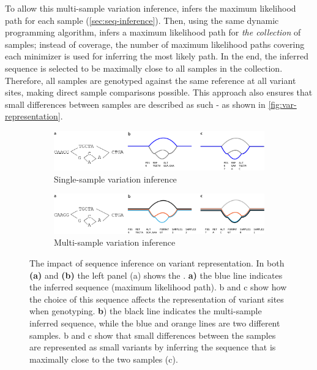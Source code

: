 To allow this multi-sample variation inference, \pandora{} infers the maximum likelihood path for each sample (\autoref{sec:seq-inference}). Then, using the same dynamic programming algorithm, \pandora{} infers a maximum likelihood path for \emph{the collection} of samples; instead of \kmer{} coverage, the number of maximum likelihood paths covering each minimizer is used for inferring the most likely path. In the end, the inferred sequence is selected to be maximally close to all samples in the collection. Therefore, all samples are genotyped against the same reference at all variant sites, making direct sample comparisons possible. This approach also ensures that small differences between samples are described as such - as shown in \autoref{fig:var-representation}.

\begin{figure}
     \centering
     \begin{subfigure}[b]{0.95\textwidth}
        \includegraphics[width=0.95\columnwidth]{Chapter0/Figs/map_variation_representation.png}
        \centering
        \caption{Single-sample variation inference}
        \label{fig:map-var-representation}
     \end{subfigure}
     \begin{subfigure}[b]{0.95\textwidth}
         \centering
        \includegraphics[width=0.95\columnwidth]{Chapter0/Figs/variant_representation.png}
         \caption{Multi-sample variation inference}
         \label{fig:var-representation}
     \end{subfigure}
     \caption{The impact of sequence inference on variant representation. In both \textbf{(a)} and \textbf{(b)} the left panel (a) shows the \prg{}. \textbf{a)} the blue line indicates the inferred sequence (maximum likelihood path). b and c show how the choice of this sequence affects the representation of variant sites when genotyping. \textbf{b}) the black line indicates the multi-sample inferred sequence, while the blue and orange lines are two different samples. b and c show that small differences between the samples are represented as small variants by inferring the sequence that is maximally close to the two samples (c).}
     \label{fig:pandora-var-representation}
\end{figure}

